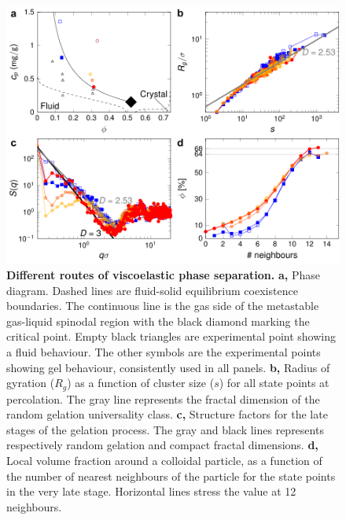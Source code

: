 \documentclass[preprint,amsmath,amssymb,superscriptaddress]{revtex4}
\begin{document}
\begin{figure}[!t]
 \centering
 \includegraphics{phase_separation.pdf}
 \caption{{\bf Different routes of viscoelastic phase separation.} 
{\bf a,} Phase diagram. Dashed lines are fluid-solid equilibrium coexistence boundaries. The continuous line is the gas side of the metastable gas-liquid spinodal region with the black diamond marking the critical point. Empty black triangles are experimental point showing a fluid behaviour. The other symbols are the experimental points showing gel behaviour, consistently used in all panels.
{\bf b,} Radius of gyration ($R_g$) as a function of cluster size ($s$) for all state points at percolation. The
 gray line represents the fractal dimension of the random gelation universality class.
{\bf c,} Structure factors for the late stages of the gelation process. The gray and black lines represents respectively random gelation and compact fractal dimensions.
{\bf d,} Local volume fraction around a colloidal particle, as a function of the number of nearest neighbours of the particle for the state points in the very late stage. Horizontal lines stress the value at 12 neighbours.
 }
 \label{fig:phase_separation}
\end{figure}



\clearpage
\end{document}
